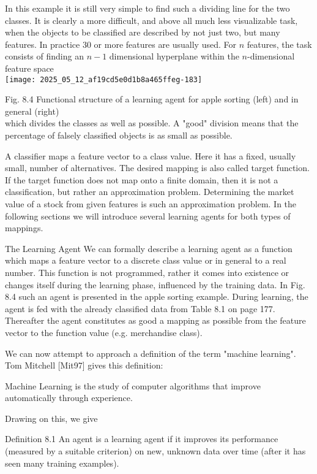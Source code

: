 \documentclass[10pt]{article}
\begin{document}
In this example it is still very simple to find such a dividing line for the two classes. It is clearly a more difficult, and above all much less visualizable task, when the objects to be classified are described by not just two, but many features. In practice 30 or more features are usually used. For $n$ features, the task consists of finding an $n-1$ dimensional hyperplane within the $n$-dimensional feature space\\
\texttt{[image: 2025\_05\_12\_af19cd5e0d1b8a465ffeg-183]}

Fig. 8.4 Functional structure of a learning agent for apple sorting (left) and in general (right)\\
which divides the classes as well as possible. A "good" division means that the percentage of falsely classified objects is as small as possible.

A classifier maps a feature vector to a class value. Here it has a fixed, usually small, number of alternatives. The desired mapping is also called target function. If the target function does not map onto a finite domain, then it is not a classification, but rather an approximation problem. Determining the market value of a stock from given features is such an approximation problem. In the following sections we will introduce several learning agents for both types of mappings.

The Learning Agent We can formally describe a learning agent as a function which maps a feature vector to a discrete class value or in general to a real number. This function is not programmed, rather it comes into existence or changes itself during the learning phase, influenced by the training data. In Fig. 8.4 such an agent is presented in the apple sorting example. During learning, the agent is fed with the already classified data from Table 8.1 on page 177. Thereafter the agent constitutes as good a mapping as possible from the feature vector to the function value (e.g. merchandise class).

We can now attempt to approach a definition of the term "machine learning". Tom Mitchell [Mit97] gives this definition:

Machine Learning is the study of computer algorithms that improve automatically through experience.

Drawing on this, we give

Definition 8.1 An agent is a learning agent if it improves its performance (measured by a suitable criterion) on new, unknown data over time (after it has seen many training examples).
\end{document}
